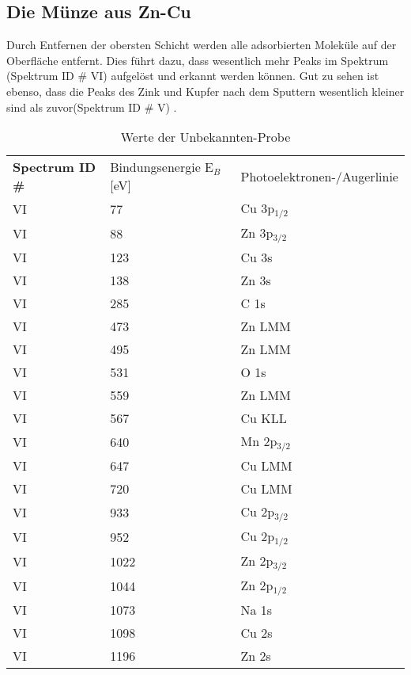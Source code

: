 \documentclass{article}
\begin{document}
\newpage

\subsection{Die Münze aus Zn-Cu}
Durch Entfernen der obersten Schicht werden alle adsorbierten Moleküle auf der
Oberfläche entfernt. Dies führt dazu, dass wesentlich mehr Peaks im Spektrum
(Spektrum ID \# VI) aufgelöst und erkannt werden können. Gut zu sehen ist
ebenso, dass die Peaks des Zink und Kupfer nach dem Sputtern wesentlich kleiner
sind als zuvor(Spektrum ID \# V) .

\begin{table}[!htpb]
  \begin{tabularx}{\textwidth}{XXX}
    \textbf{Spectrum ID \#} & Bindungsenergie E$_B$ [eV] & Photoelektronen-/Augerlinie\\
    VI      &77 & Cu 3p$_{1/2}$ \\
    VI      & 88 & Zn 3p$_{3/2}$ \\
    VI      & 123 & Cu 3s \\
    VI     & 138 & Zn 3s \\
    VI     & 285 & C 1s \\
    VI     & 473 & Zn LMM \\
    VI    & 495 & Zn LMM \\
    VI    & 531 & O 1s \\
    VI    & 559 & Zn LMM \\
    VI             & 567 & Cu KLL \\
    VI             & 640 & Mn 2p$_{3/2}$ \\
    VI             & 647 & Cu LMM \\
    VI            & 720 & Cu LMM \\
    VI            & 933 & Cu 2p$_{3/2}$ \\
    VI            & 952 & Cu 2p$_{1/2}$ \\
    VI           & 1022 & Zn 2p$_{3/2}$\\
    VI           & 1044 & Zn 2p$_{1/2}$ \\
    VI           & 1073 & Na 1s \\
    VI          & 1098 & Cu 2s \\
    VI          & 1196 & Zn 2s \\
  \end{tabularx}  

  \caption{Werte der Unbekannten-Probe}
\end{table}
\newpage
\end{document}
